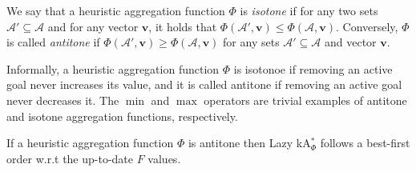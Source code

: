 \documentclass[smallextended]{svjour3}       %
\newcommand{\kastar}{kA$^*$\xspace}
\newcommand{\kastarphi}{\textup{kA}$^*_{\Phi}$\xspace}
\newcommand{\open}{\textsc{Open}\xspace}
\newcommand{\activeg}{\mathcal{A}}
\newcommand{\vect}[1]{\mathbf{#1}}
\begin{document}
\begin{definition}
We say that a heuristic aggregation function $\Phi$ is \emph{isotone} if for any two sets $\activeg' \subseteq \activeg$ and for any vector $\vect{v}$, it holds that $\Phi(\activeg', \vect{v})\leq \Phi(\activeg, \vect{v})$.
Conversely, $\Phi$ is called \emph{antitone} if $\Phi(\activeg', \vect{v})\geq \Phi(\activeg, \vect{v})$ for any sets $\activeg'\subseteq \activeg$ and vector $\vect{v}$.
\end{definition}
Informally, a heuristic aggregation function $\Phi$ is isotonoe if removing an active goal never increases its value, and it is called antitone if removing an active goal never decreases it. 
The $\min$ and $\max$ operators are trivial examples of antitone and isotone aggregation functions, respectively.
\begin{theorem}
  If a heuristic aggregation function $\Phi$ is antitone then Lazy \kastarphi follows a best-first order w.r.t the up-to-date $F$ values. %
  \label{the:lazyGood}
\end{theorem}
\end{document}
